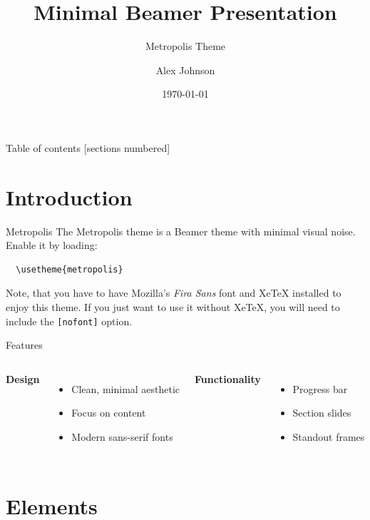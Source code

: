 \documentclass[aspectratio=169]{beamer}
\title{Minimal Beamer Presentation}
\subtitle{Metropolis Theme}
\date{\today}
\author{Alex Johnson}
\institute{Center for Modern Research}
\begin{document}
\maketitle

\begin{frame}{Table of contents}
  [sections numbered]
  \tableofcontents[hideallsubsections]
\end{frame}

\section{Introduction}

\begin{frame}[fragile]{Metropolis}
  The Metropolis theme is a Beamer theme with minimal visual noise.
  Enable it by loading:
  \begin{verbatim}
  \usetheme{metropolis}
  \end{verbatim}

  Note, that you have to have Mozilla's \emph{Fira Sans} font and XeTeX
  installed to enjoy this theme. If you just want to use it without
  XeTeX, you will need to include the \texttt{[nofont]} option.
\end{frame}

\begin{frame}{Features}
  \begin{columns}[T, onlytextwidth]
      \textbf{Design}
      \begin{itemize}
        \item Clean, minimal aesthetic
        \item Focus on content
        \item Modern sans-serif fonts
      \end{itemize}

      \textbf{Functionality}
      \begin{itemize}
        \item Progress bar
        \item Section slides
        \item Standout frames
      \end{itemize}
  \end{columns}
\end{frame}

\section{Elements}
\end{document}
